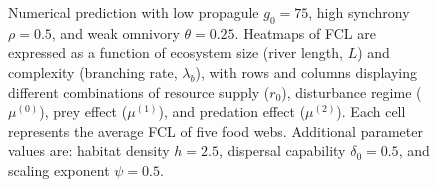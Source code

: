 \begin{figure}
\centering
{}
\caption{Numerical prediction with low propagule \(g_0 = 75\), high
synchrony \(\rho = 0.5\), and weak omnivory \(\theta = 0.25\). Heatmaps
of FCL are expressed as a function of ecosystem size (river length,
\(L\)) and complexity (branching rate, \(\lambda_b\)), with rows and
columns displaying different combinations of resource supply (\(r_0\)),
disturbance regime (\(\mu^{(0)}\)), prey effect (\(\mu^{(1)}\)), and
predation effect (\(\mu^{(2)}\)). Each cell represents the average FCL
of five food webs. Additional parameter values are: habitat density
\(h=2.5\), dispersal capability \(\delta_0=0.5\), and scaling exponent
\(\psi=0.5\).}
\end{figure}

\newpage

